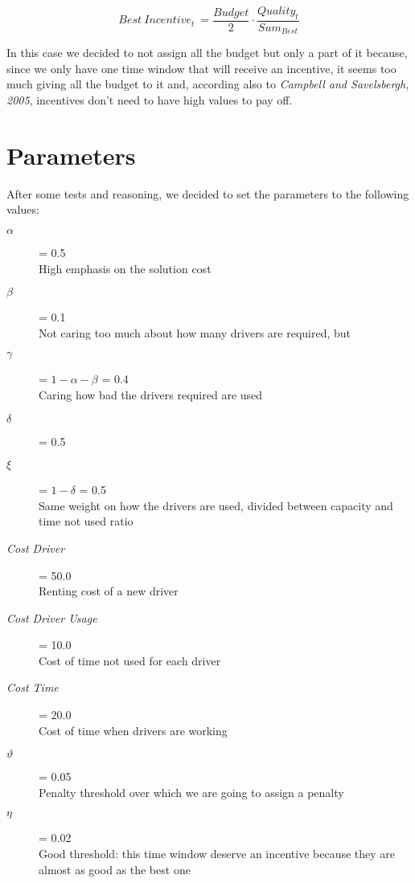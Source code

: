 \documentclass[10pt, letterpaper]{article}
\begin{document}
\[Best\ Incentive_{t}\ = \frac{Budget}{2} \cdot \frac{Quality_{t}}{Sum_{Best}}
\]

In this case we decided to not assign all the budget but only a part of it
because, since we only have one time window that will receive an incentive, it
seems too much giving all the budget to it and, according also to \emph{Campbell
and Savelsbergh, 2005}, incentives don't need to have high values to pay off.

\section{Parameters}
After some tests and reasoning, we decided to set the parameters to the
following values:
\begin{description}
	\item[\emph{$\alpha$}] = 0.5 \hfill \\
		High emphasis on the solution cost
	\item[\emph{$\beta$}] = 0.1 \hfill \\
		Not caring too much about how many drivers are required, but
	\item[\emph{$\gamma$}] = $1-\alpha-\beta$ = 0.4 \hfill \\
		Caring how bad the drivers required are used
	\item[\emph{$\delta$}] = 0.5
	\item[\emph{$\xi$}] = $1-\delta$ = 0.5 \hfill \\
		Same weight on how the drivers are used, divided between capacity and
		time not used ratio
	\item[\emph{Cost Driver}] = 50.0 \hfill \\
		Renting cost of a new driver
	\item[\emph{Cost Driver Usage}] = 10.0 \hfill \\
		Cost of time not used for each driver
	\item[\emph{Cost Time}] = 20.0 \hfill \\
		Cost of time when drivers are working
	\item[\emph{$\vartheta$}] = 0.05 \hfill \\
		Penalty threshold over which we are going to assign a penalty
	\item[\emph{$\eta$}] = 0.02 \hfill \\
		Good threshold: this time window deserve an incentive because they are
		almost as good as the best one
	
\end{description}
\end{document}
